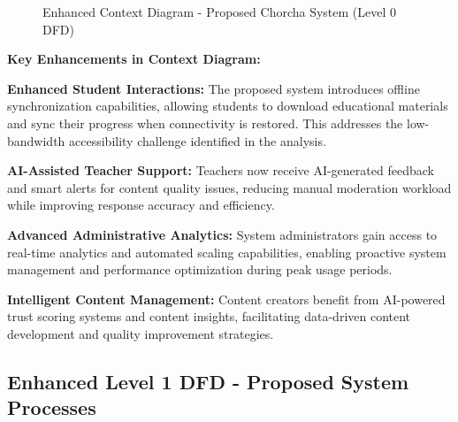 \documentclass[12pt,a4paper,oneside]{book}
\begin{document}
\begin{figure}[H]
{
    }
    \caption{Enhanced Context Diagram - Proposed Chorcha System (Level 0 DFD)}
\end{figure}

\textbf{Key Enhancements in Context Diagram:}

\textbf{Enhanced Student Interactions:} The proposed system introduces offline synchronization capabilities, allowing students to download educational materials and sync their progress when connectivity is restored. This addresses the low-bandwidth accessibility challenge identified in the analysis.

\textbf{AI-Assisted Teacher Support:} Teachers now receive AI-generated feedback and smart alerts for content quality issues, reducing manual moderation workload while improving response accuracy and efficiency.

\textbf{Advanced Administrative Analytics:} System administrators gain access to real-time analytics and automated scaling capabilities, enabling proactive system management and performance optimization during peak usage periods.

\textbf{Intelligent Content Management:} Content creators benefit from AI-powered trust scoring systems and content insights, facilitating data-driven content development and quality improvement strategies.

\subsection{Enhanced Level 1 DFD - Proposed System Processes}
\end{document}
